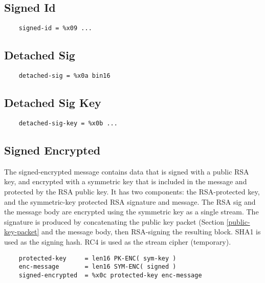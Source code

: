 \documentclass[letterpaper,11pt,oneside]{article}
\begin{document}
\subsection{Signed Id}
\label{signed-packet}

\vspace{10pt}
\begin{verbatim}
    signed-id = %x09 ...
\end{verbatim}
\vspace{10pt}

\subsection{Detached Sig}

\vspace{10pt}
\begin{verbatim}
    detached-sig = %x0a bin16
\end{verbatim}
\vspace{10pt}

\subsection{Detached Sig Key}

\vspace{10pt}
\begin{verbatim}
    detached-sig-key = %x0b ...
\end{verbatim}
\vspace{10pt}

\subsection{Signed Encrypted}

The signed-encrypted message contains data that is signed with a public RSA
key, and encrypted with a symmetric key that is included in the message and
protected by the RSA public key. It has two components: the RSA-protected key,
and the symmetric-key protected RSA signature and message. The RSA sig and the
message body are encrypted using the symmetric key as a single stream. The
signature is produced by concatenating the public key packet (Section
\ref{public-key-packet} and the message body, then RSA-signing the resulting
block. SHA1 is used as the signing hash. RC4 is used as the stream cipher
(temporary).

\vspace{10pt}
\begin{verbatim}
    protected-key     = len16 PK-ENC( sym-key )
    enc-message       = len16 SYM-ENC( signed )
    signed-encrypted  = %x0c protected-key enc-message
\end{verbatim}
\vspace{10pt}
\end{document}
